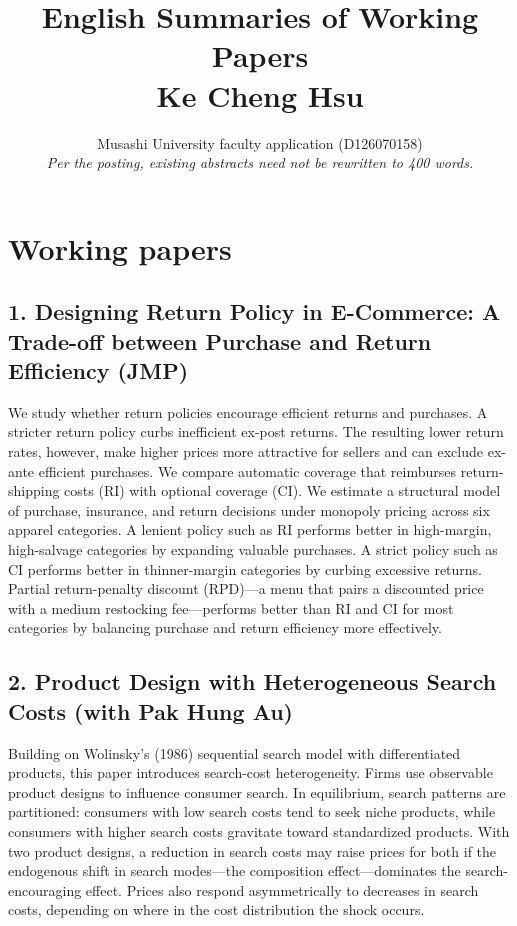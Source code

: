 \documentclass[11pt]{article}
\title{English Summaries of Working Papers\\{\large Ke Cheng Hsu}}
\author{Musashi University faculty application (D126070158)\\
\textit{Per the posting, existing abstracts need not be rewritten to 400 words.}}
\date{}
\begin{document}
\maketitle
\vspace{-1em}

\section*{Working papers}

\subsection*{1. Designing Return Policy in E-Commerce: A Trade-off between Purchase and Return Efficiency (JMP)}
We study whether return policies encourage efficient returns and purchases. A stricter return policy curbs inefficient ex-post returns. The resulting lower return rates, however, make higher prices more attractive for sellers and can exclude ex-ante efficient purchases. We compare automatic coverage that reimburses return-shipping costs (RI) with optional coverage (CI). We estimate a structural model of purchase, insurance, and return decisions under monopoly pricing across six apparel categories. A lenient policy such as RI performs better in high-margin, high-salvage categories by expanding valuable purchases. A strict policy such as CI performs better in thinner-margin categories by curbing excessive returns. Partial return-penalty discount (RPD)---a menu that pairs a discounted price with a medium restocking fee---performs better than RI and CI for most categories by balancing purchase and return efficiency more effectively.

\subsection*{2. Product Design with Heterogeneous Search Costs (with Pak Hung Au)}
Building on Wolinsky's (1986) sequential search model with differentiated products, this paper introduces search-cost heterogeneity. Firms use observable product designs to influence consumer search. In equilibrium, search patterns are partitioned: consumers with low search costs tend to seek niche products, while consumers with higher search costs gravitate toward standardized products. With two product designs, a reduction in search costs may raise prices for both if the endogenous shift in search modes---the composition effect---dominates the search-encouraging effect. Prices also respond asymmetrically to decreases in search costs, depending on where in the cost distribution the shock occurs.
\end{document}
